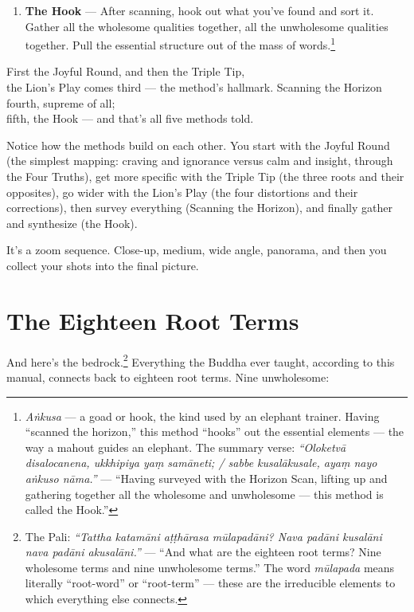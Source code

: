 \begin{enumerate}[leftmargin=*, itemsep=8pt]
\item \textbf{The Hook} --- After scanning, hook out what you've found and sort it. Gather all the wholesome qualities together, all the unwholesome qualities together. Pull the essential structure out of the mass of words.\footnote{\textit{Aṅkusa} --- a goad or hook, the kind used by an elephant trainer. Having ``scanned the horizon,'' this method ``hooks'' out the essential elements --- the way a mahout guides an elephant. The summary verse: \textit{``Oloketvā disalocanena, ukkhipiya yaṃ samāneti; / sabbe kusalākusale, ayaṃ nayo aṅkuso nāma.''} --- ``Having surveyed with the Horizon Scan, lifting up and gathering together all the wholesome and unwholesome --- this method is called the Hook.''}
\end{enumerate}

\begin{versebox}
First the Joyful Round, and then the Triple Tip,\\
the Lion's Play comes third --- the method's hallmark.
\stanza
Scanning the Horizon fourth, supreme of all;\\
fifth, the Hook --- and that's all five methods told.
\end{versebox}

Notice how the methods build on each other. You start with the Joyful Round (the simplest mapping: craving and ignorance versus calm and insight, through the Four Truths), get more specific with the Triple Tip (the three roots and their opposites), go wider with the Lion's Play (the four distortions and their corrections), then survey everything (Scanning the Horizon), and finally gather and synthesize (the Hook).

It's a zoom sequence. Close-up, medium, wide angle, panorama, and then you collect your shots into the final picture.

\ornament

\section*{The Eighteen Root Terms}

And here's the bedrock.\footnote{The Pali: \textit{``Tattha katamāni aṭṭhārasa mūlapadāni? Nava padāni kusalāni nava padāni akusalāni.''} --- ``And what are the eighteen root terms? Nine wholesome terms and nine unwholesome terms.'' The word \textit{mūlapada} means literally ``root-word'' or ``root-term'' --- these are the irreducible elements to which everything else connects.} Everything the Buddha ever taught, according to this manual, connects back to eighteen root terms. Nine unwholesome:

